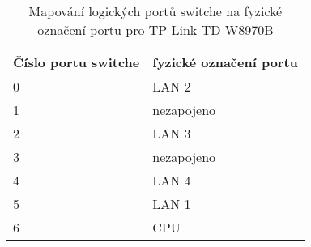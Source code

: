 \begin{table}[h!]
\begin{center}
\begin{tabular}{|l|l|}
\hline
Číslo portu switche & fyzické označení portu \\ \hline
0 & LAN 2  \\ \hline
1 & nezapojeno \\ \hline
2 & LAN 3 \\ \hline
3 & nezapojeno \\ \hline
4 & LAN 4 \\ \hline
5 & LAN 1 \\ \hline
6 & CPU \\ \hline
\end{tabular}
\caption{Mapování logických portů switche na fyzické označení portu pro TP-Link TD-W8970B}
\end{center}
\end{table}
